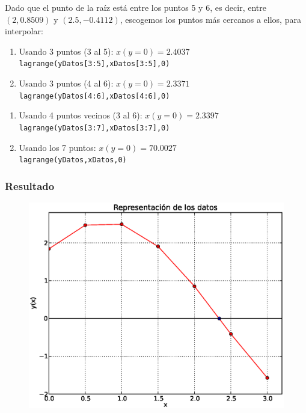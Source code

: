 \begin{frame}
Dado que el punto de la ra\'{i}z est\'{a} entre los puntos 5 y 6, es decir, entre $(2,0.8509)$ y $(2.5,-0.4112)$, escogemos los puntos m\'{a}s cercanos a ellos, para interpolar:
\begin{enumerate}
\item Usando 3 puntos (3 al 5): \hspace{1.5cm} $x(y=0) = 2.4037$
\\
\medskip \texttt{lagrange(yDatos[3:5],xDatos[3:5],0)}
\item Usando 3 puntos (4 al 6): \hspace{1.5cm} $x(y=0) = 2.3371$
\\
\medskip \texttt{lagrange(yDatos[4:6],xDatos[4:6],0)}
\end{enumerate}
\end{frame}
\begin{frame}
\begin{enumerate}
\item Usando 4 puntos vecinos (3 al 6): \hspace{1.5cm} $x(y=0) = 2.3397$
\\
\medskip \texttt{lagrange(yDatos[3:7],xDatos[3:7],0)}
\item Usando los 7 puntos: \hspace{1.5cm} $x(y=0) = 70.0027$
\\
\medskip \texttt{lagrange(yDatos,xDatos,0)}
\end{enumerate}
\end{frame}
\begin{frame}
\frametitle{Resultado}
\begin{figure}
	\centering
	\includegraphics[scale=0.45]{Imagenes/Tarea_Raices_Problema_2_02.eps} 
\end{figure}
\end{frame}
